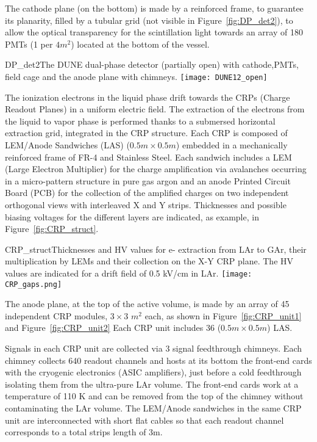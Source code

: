 The cathode plane (on the bottom) is made by a reinforced frame, to guarantee its planarity, filled by a tubular grid (not visible in Figure~\ref{fig:DP_det2}), to allow the optical transparency for the scintillation light towards an array of 180 PMTs (1 per $4m^2$) located at the bottom of the vessel.

\begin{cdrfigure}{DP_det2}{The DUNE dual-phase detector (partially open) with cathode,PMTs, field cage and the anode plane with chimneys.}
\texttt{[image: DUNE12\_open]}
\end{cdrfigure}

The ionization electrons in the liquid phase drift towards the CRPs (Charge Readout Planes)  in a uniform electric field. The extraction of the electrons from the liquid to vapor phase is performed thanks to a submersed horizontal extraction grid, integrated in the  CRP structure.  Each CRP is composed of LEM/Anode Sandwiches (LAS) ($0.5m\times 0.5m$) embedded in  a mechanically reinforced frame of FR-4 and Stainless Steel.  Each sandwich includes a  LEM (Large Electron Multiplier) for the charge amplification via avalanches occurring in a micro-pattern structure in pure gas argon and an anode Printed Circuit Board (PCB) for the collection of the amplified charges on two independent orthogonal views with interleaved X and Y strips.  Thicknesses and possible biasing voltages for the different layers are indicated, as example, in Figure~\ref{fig:CRP_struct}. 

\begin{cdrfigure}{CRP_struct}{Thicknesses and HV values for e- extraction from LAr to GAr, their multiplication by LEMs and their collection on the X-Y CRP plane. The HV values are indicated for a drift field of 0.5 kV/cm in LAr.}
\texttt{[image: CRP\_gaps.png]}
\end{cdrfigure}

The anode plane, at the top of the active volume, is made by an array of 45 independent CRP modules, $3\times3$ $m^2$ each, as shown in Figure~\ref{fig:CRP_unit1} and Figure~\ref{fig:CRP_unit2} Each CRP unit includes 36 ($0.5m\times 0.5m$) LAS. 

Signals in each CRP unit are collected via 3 signal feedthrough chimneys. Each chimney collects 640 readout channels and hosts at its bottom the front-end cards with the cryogenic electronics (ASIC amplifiers), just before a cold feedthrough isolating them from the ultra-pure LAr volume. The front-end cards work at a temperature of 110 K and can be removed from the top of the chimney without contaminating the LAr volume. The LEM/Anode sandwiches in the same CRP unit are interconnected with short flat cables so that each readout channel corresponds to a total strips length of 3m.
  
